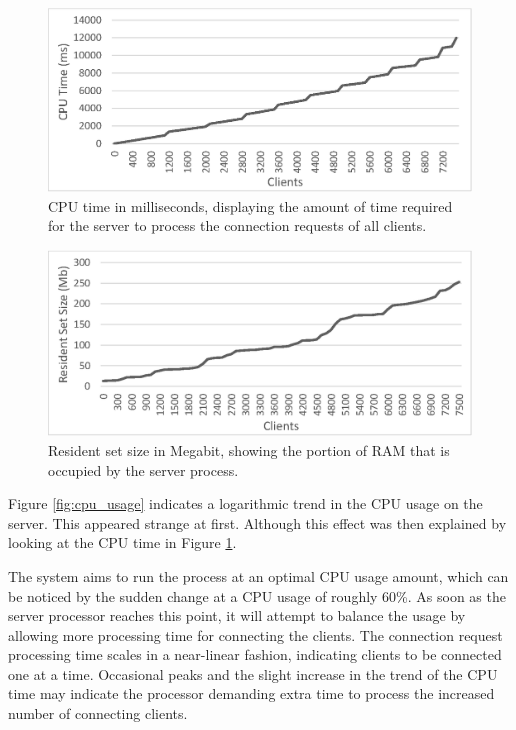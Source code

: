 \documentclass[bsc, 12pt, twoside, singlespacing, parskip, abbrevs, notimes, normalheadings, logo]{styles/infthesis}
\begin{document}
\begin{figure}[H]
\centering
\includegraphics[scale=0.9]{images/test_CLIENT_CPUtime.eps}
\caption{CPU time in milliseconds, displaying the amount of time required for the server to process the connection requests of all clients.}
\label{fig:cpu_time}
\end{figure}

\begin{figure}[H]
\centering
\includegraphics[scale=0.9]{images/test_CLIENT_RSS.eps}
%
\caption{Resident set size in Megabit, showing the portion of RAM that is occupied by the server process.}
\label{fig:cpu_rss}
\end{figure}

Figure \ref{fig:cpu_usage} indicates a logarithmic trend in the CPU usage on the server. This appeared strange at first. Although this effect was then explained by looking at the CPU time in Figure \ref{fig:cpu_time}. 

The system aims to run the process at an optimal CPU usage amount, which can be noticed by the sudden change at a CPU usage of roughly 60\%. As soon as the server processor reaches this point, it will attempt to balance the usage by allowing more processing time for connecting the clients. The connection request processing time scales in a near-linear fashion, indicating clients to be connected one at a time. Occasional peaks and the slight increase in the trend of the CPU time may indicate the processor demanding extra time to process the increased number of connecting clients.
\end{document}
